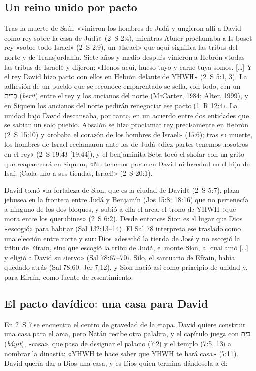 \documentclass[11pt,letterpaper]{article}
\newcommand{\heb}[1]{\mbox{\foreignlanguage{hebrew}{#1}}}
\begin{document}
\subsection{Un reino unido por pacto}
Tras la muerte de Saúl, «vinieron los hombres de Judá y ungieron allí a David como rey sobre la casa de Judá» (2~S 2:4), mientras Abner proclamaba a Is-boset rey «sobre todo Israel» (2~S 2:9), un «Israel» que aquí significa las tribus del norte y de Transjordania. Siete años y medio después vinieron a Hebrón «todas las tribus de Israel» y dijeron: «Henos aquí, hueso tuyo y carne tuya somos. [\ldots] Y el rey David hizo pacto con ellos en Hebrón delante de YHWH» (2~S 5:1, 3). La adhesión de un pueblo que se reconoce emparentado se sella, con todo, con un \heb{בְּרִית} (\emph{berit}) entre el rey y los ancianos del norte (McCarter, 1984; Alter, 1999), y en Siquem los ancianos del norte pedirán renegociar ese pacto (1~R 12:4). La unidad bajo David descansaba, por tanto, en un acuerdo entre dos entidades que se sabían un solo pueblo. Absalón se hizo proclamar rey precisamente en Hebrón (2~S 15:10) y «robaba el corazón de los hombres de Israel» (15:6); tras su muerte, los hombres de Israel reclamaron ante los de Judá «diez partes tenemos nosotros en el rey» (2~S 19:43 [19:44]), y el benjaminita Seba tocó el shofar con un grito que reaparecerá en Siquem, «No tenemos parte en David ni heredad en el hijo de Isaí. ¡Cada uno a sus tiendas, Israel!» (2~S 20:1).

David tomó «la fortaleza de Sion, que es la ciudad de David» (2~S 5:7), plaza jebusea en la frontera entre Judá y Benjamín (Jos 15:8; 18:16) que no pertenecía a ninguno de los dos bloques, y subió a ella el arca, el trono de YHWH «que mora entre los querubines» (2~S 6:2). Desde entonces Sion es el lugar que Dios «escogió» para habitar (Sal 132:13--14). El Sal 78 interpreta ese traslado como una elección entre norte y sur: Dios «desechó la tienda de José y no escogió la tribu de Efraín, sino que escogió la tribu de Judá, el monte Sion, al cual amó [\ldots] y eligió a David su siervo» (Sal 78:67--70). Silo, el santuario de Efraín, había quedado atrás (Sal 78:60; Jer 7:12), y Sion nació así como principio de unidad y, para Efraín, como fuente de resentimiento.

\subsection{El pacto davídico: una casa para David}
En 2~S 7 se encuentra el centro de gravedad de la etapa. David quiere construir una casa para el arca, pero Natán recibe otra palabra, y el capítulo juega con \heb{בַּיִת} (\emph{báyit}), «casa», que pasa de designar el palacio (7:2) y el templo (7:5, 13) a nombrar la dinastía: «YHWH te hace saber que YHWH te hará casa» (7:11). David quería dar a Dios una casa, y es Dios quien termina dándosela a él:
\end{document}
